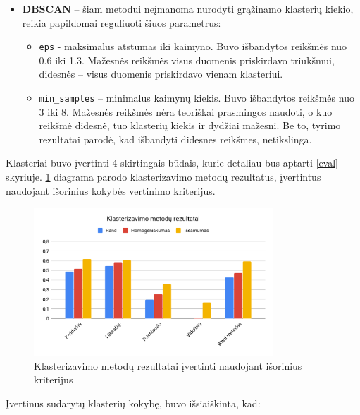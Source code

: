 \documentclass{VUMIFInfBakalaurinis}
\begin{document}
\begin{itemize}
\item
  \textbf{DBSCAN} -- šiam metodui neįmanoma nurodyti grąžinamo klasterių
  kiekio, reikia papildomai reguliuoti šiuos parametrus:

  \begin{itemize}
  \item
    \texttt{eps} - maksimalus atstumas iki kaimyno. Buvo išbandytos reikšmės nuo
    0.6 iki 1.3. Mažesnės reikšmės visus duomenis priskirdavo triukšmui,
    didesnės -- visus duomenis priskirdavo vienam klasteriui.
  \item
    \texttt{min\_samples} -- minimalus kaimynų kiekis. Buvo išbandytos reikšmės
    nuo 3 iki 8. Mažesnės reikšmės nėra teoriškai prasmingos naudoti, o
    kuo reikšmė didesnė, tuo klasterių kiekis ir dydžiai mažesni. Be to,
    tyrimo rezultatai parodė, kad išbandyti didesnes reikšmes,
    netikslinga.
  \end{itemize}
\end{itemize}

Klasteriai buvo įvertinti 4 skirtingais būdais, kurie detaliau bus
aptarti \ref{eval} skyriuje. \ref{clusters} diagrama parodo klasterizavimo metodų rezultatus,
įvertintus naudojant išorinius kokybės vertinimo kriterijus.

\begin{figure}[H]
	\centering
	\includegraphics[width=0.8\textwidth]{./img/image27.png}
  \caption{Klasterizavimo metodų rezultatai įvertinti naudojant išorinius
  kriterijus}
  \label{clusters}
\end{figure}

Įvertinus sudarytų klasterių kokybę, buvo išsiaiškinta, kad:
\end{document}
